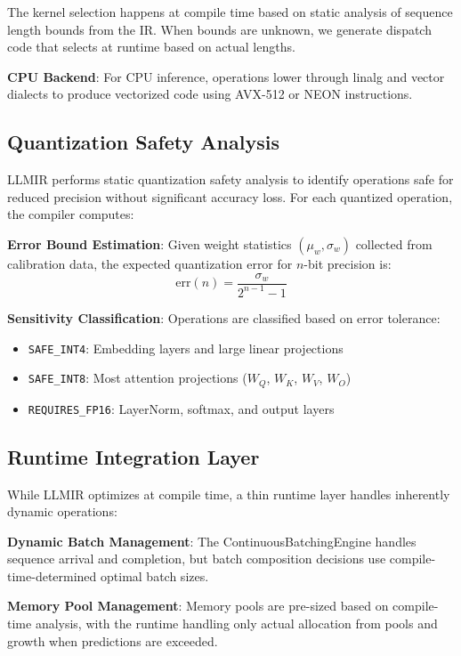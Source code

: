 \documentclass[conference]{IEEEtran}
\begin{document}
The kernel selection happens at compile time based on static analysis of sequence length bounds from the IR. When bounds are unknown, we generate dispatch code that selects at runtime based on actual lengths.

\textbf{CPU Backend}: For CPU inference, operations lower through linalg and vector dialects to produce vectorized code using AVX-512 or NEON instructions.

\subsection{Quantization Safety Analysis}

LLMIR performs static quantization safety analysis to identify operations safe for reduced precision without significant accuracy loss. For each quantized operation, the compiler computes:

\textbf{Error Bound Estimation}: Given weight statistics $(\mu_w, \sigma_w)$ collected from calibration data, the expected quantization error for $n$-bit precision is:
$$\text{err}(n) = \frac{\sigma_w}{2^{n-1} - 1}$$

\textbf{Sensitivity Classification}: Operations are classified based on error tolerance:
\begin{itemize}
    \item \texttt{SAFE\_INT4}: Embedding layers and large linear projections
    \item \texttt{SAFE\_INT8}: Most attention projections ($W_Q$, $W_K$, $W_V$, $W_O$)
    \item \texttt{REQUIRES\_FP16}: LayerNorm, softmax, and output layers
\end{itemize}

\subsection{Runtime Integration Layer}

While LLMIR optimizes at compile time, a thin runtime layer handles inherently dynamic operations:

\textbf{Dynamic Batch Management}: The ContinuousBatchingEngine handles sequence arrival and completion, but batch composition decisions use compile-time-determined optimal batch sizes.

\textbf{Memory Pool Management}: Memory pools are pre-sized based on compile-time analysis, with the runtime handling only actual allocation from pools and growth when predictions are exceeded.
\end{document}
